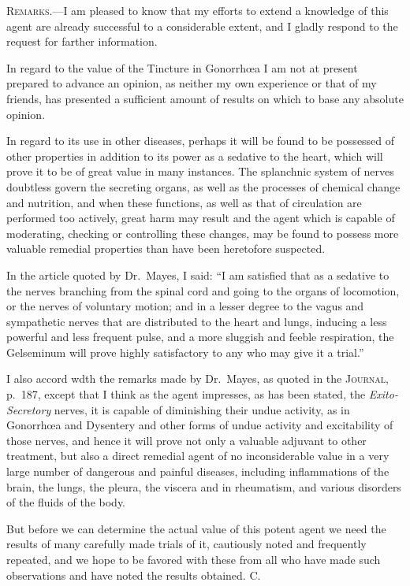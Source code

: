 
\textsc{Remarks.}---I am pleased to know that my efforts to extend a knowledge
of this agent are already successful to a considerable extent, and I
gladly respond to the request for farther information.

In regard to the value of the Tincture in Gonorrhœa I am not at
present prepared to advance an opinion, as neither my own experience
or that of my friends, has presented a sufficient amount of results on
which to base any absolute opinion.

In regard to its use in other diseases, perhaps it will be found to be
possessed of other properties in addition to its power as a sedative to
the heart, which will prove it to be of great value in many instances.
The splanchnic system of nerves doubtless govern the secreting organs,
as well as the processes of chemical change and nutrition, and when
these functions, as well as that of circulation are performed too actively,
great harm may result and the agent which is capable of
moderating, checking or controlling these changes, may be found to
possess more valuable remedial properties than have been heretofore
suspected.

In the article quoted by Dr.~Mayes, I said: ``I am satisfied that as
a sedative to the nerves branching from the spinal cord and going to
the organs of locomotion, or the nerves of voluntary motion; and in a
lesser degree to the vagus and sympathetic nerves that are distributed
to the heart and lungs, inducing a less powerful and less frequent pulse,
and a more sluggish and feeble respiration, the Gelseminum will prove
highly satisfactory to any who may give it a trial.''

I also accord wdth the remarks made by Dr.~Mayes, as quoted in the
\textsc{Journal}, p.~187, except that I think as the agent impresses, as has
been stated, the \emph{Exito-Secretory} nerves, it is capable of diminishing their
undue activity, as in Gonorrhœa and Dysentery and other forms of undue
activity and excitability of those nerves, and hence it will prove
not only a valuable adjuvant to other treatment, but also a direct remedial
agent of no inconsiderable value in a very large number of dangerous
and painful diseases, including inflammations of the brain, the
lungs, the pleura, the viscera and in rheumatism, and various disorders
of the fluids of the body.

But before we can determine the actual value of this potent agent
we need the results of many carefully made trials of it, cautiously noted
and frequently repeated, and we hope to be favored with these from
all who have made such observations and have noted the results obtained.
\hfill{}C.\quad\endinput
